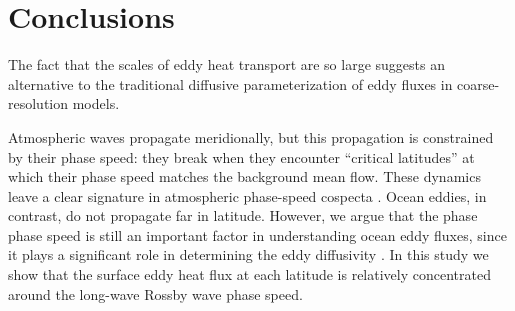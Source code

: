 \documentclass[10pt]{article}
\begin{document}
\section{Conclusions}

The fact that the scales of eddy heat transport are so large suggests an alternative to the traditional diffusive parameterization of eddy fluxes in coarse-resolution models. 


Atmospheric waves propagate meridionally, but this propagation is constrained by their phase speed: they break when they encounter ``critical latitudes'' at which their phase speed matches the background mean flow. These dynamics leave a clear signature in atmospheric phase-speed cospecta \citep{ChenHeld2007}. Ocean eddies, in contrast, do not propagate far in latitude. However, we argue that the phase phase speed is still an important factor in understanding ocean eddy fluxes, since it plays a significant role in determining the eddy diffusivity \citep{AbernatheyEtAl2010,FerrariNikurashin2010}. In this study we show that the surface eddy heat flux at each latitude is relatively concentrated around the long-wave Rossby wave phase speed.




{}
{\clearpage}

{}
{\clearpage}


\end{document}
